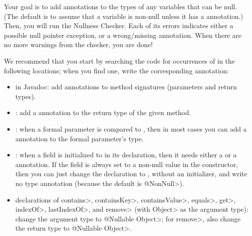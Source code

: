 Your goal is to add  annotations
to the types of any variables that can be null.  (The default is to assume
that a variable is non-null unless it has a  annotation.)
Then, you will run the Nullness Checker.  Each of its errors indicates
either a possible null pointer exception, or a wrong/missing annotation.
When there are no more warnings from the checker, you are done!

We recommend that you start by searching the code for occurrences of
 in the following locations; when you find one, write the
corresponding annotation:

\begin{itemize}
\item
  in Javadoc:  add  annotations to method signatures (parameters and return types).
\item
  :  add a  annotation to the return type
  of the given method.
\item
  :  when a formal parameter is compared to
  , then in most cases you can add a  annotation
  to the formal parameter's type.
\item
  :  when a field is initialized to
   in its declaration, then it needs either a
   or a
   annotation.  If the field
  is always set to a non-null value in the constructor, then you can just
  change the declaration to , without an
  initializer, and write no type annotation (because the default is
  \<@NonNull>).
\item
  declarations of \<contains>, \<containsKey>, \<containsValue>, \<equals>,
  \<get>, \<indexOf>, \<lastIndexOf>, and \<remove> (with \<Object> as the
  argument type):
  change the argument type to \<@Nullable Object>; for \<remove>, also change
  the return type to \<@Nullable Object>.

\end{itemize}

